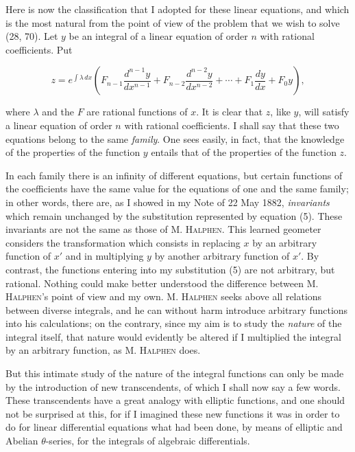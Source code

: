 \documentclass[11pt]{article}
\begin{document}
Here is now the classification that I adopted for these linear equations, and which is the most natural from the point of view of the problem that we wish to solve (28, 70). Let $y$ be an integral of a linear equation of order $n$ with rational coefficients. Put

\begin{equation}
 z=e^{\int \lambda\,dx}\left(F_{n-1}\frac{d^{n-1}y}{dx^{n-1}}+F_{n-2}\frac{d^{n-2}y}{dx^{n-2}}+\cdots+F_1\frac{dy}{dx}+F_0y\right),
\tag{5}
\end{equation}

where $\lambda$ and the $F$ are rational functions of $x$. It is clear that $z$, like $y$, will satisfy a linear equation of order $n$ with rational coefficients. I shall say that these two equations belong to the same \emph{family}. One sees easily, in fact, that the knowledge of the properties of the function $y$ entails that of the properties of the function $z$.

In each family there is an infinity of different equations, but certain functions of the coefficients have the same value for the equations of one and the same family; in other words, there are, as I showed in my Note of 22 May 1882, \emph{invariants} which remain unchanged by the substitution represented by equation (5). These invariants are not the same as those of M. \textsc{Halphen}. This learned geometer considers the transformation which consists in replacing $x$ by an arbitrary function of $x'$ and in multiplying $y$ by another arbitrary function of $x'$. By contrast, the functions entering into my substitution (5) are not arbitrary, but rational. Nothing could make better understood the difference between M. \textsc{Halphen}’s point of view and my own. M. \textsc{Halphen} seeks above all relations between diverse integrals, and he can without harm introduce arbitrary functions into his calculations; on the contrary, since my aim is to study the \emph{nature} of the integral itself, that nature would evidently be altered if I multiplied the integral by an arbitrary function, as M. \textsc{Halphen} does.

But this intimate study of the nature of the integral functions can only be made by the introduction of new transcendents, of which I shall now say a few words. These transcendents have a great analogy with elliptic functions, and one should not be surprised at this, for if I imagined these new functions it was in order to do for linear differential equations what had been done, by means of elliptic and Abelian $\theta$-series, for the integrals of algebraic differentials.
\end{document}
